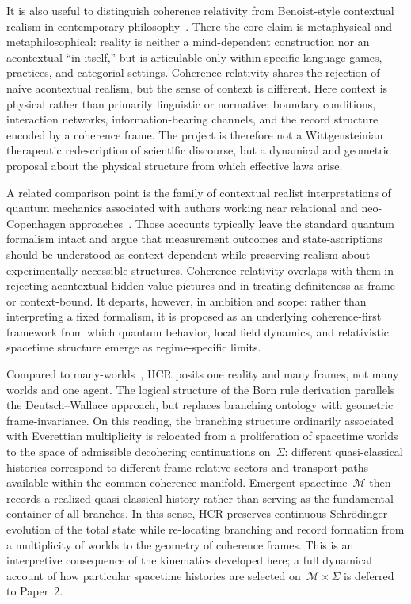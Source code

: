 \documentclass[aps,prd,twocolumn,superscriptaddress,nofootinbib,floatfix]{revtex4-2}
\newcommand{\Sig}{\Sigma}
\newcommand{\HCR}{HCR}
\newcommand{\CR}{\HCR}  %
\begin{document}
It is also useful to distinguish coherence relativity from Benoist-style contextual realism in contemporary philosophy~\cite{Benoist2021ContextualRealism}. There the core claim is metaphysical and metaphilosophical: reality is neither a mind-dependent construction nor an acontextual ``in-itself,'' but is articulable only within specific language-games, practices, and categorial settings. Coherence relativity shares the rejection of naive acontextual realism, but the sense of context is different. Here context is physical rather than primarily linguistic or normative: boundary conditions, interaction networks, information-bearing channels, and the record structure encoded by a coherence frame. The project is therefore not a Wittgensteinian therapeutic redescription of scientific discourse, but a dynamical and geometric proposal about the physical structure from which effective laws arise.

A related comparison point is the family of contextual realist interpretations of quantum mechanics associated with authors working near relational and neo-Copenhagen approaches~\cite{Pris2021RealMeaningQuantumMechanics}. Those accounts typically leave the standard quantum formalism intact and argue that measurement outcomes and state-ascriptions should be understood as context-dependent while preserving realism about experimentally accessible structures. Coherence relativity overlaps with them in rejecting acontextual hidden-value pictures and in treating definiteness as frame- or context-bound. It departs, however, in ambition and scope: rather than interpreting a fixed formalism, it is proposed as an underlying coherence-first framework from which quantum behavior, local field dynamics, and relativistic spacetime structure emerge as regime-specific limits.

Compared to many-worlds~\cite{everettRelativeStateFormulation1957,dewittManyWorldsInterpretationQuantum1973}, \CR{} posits one reality and many frames, not many worlds and one agent. The logical structure of the Born rule derivation parallels the Deutsch--Wallace approach, but replaces branching ontology with geometric frame-invariance. On this reading, the branching structure ordinarily associated with Everettian multiplicity is relocated from a proliferation of spacetime worlds to the space of admissible decohering continuations on~$\Sig$: different quasi-classical histories correspond to different frame-relative sectors and transport paths available within the common coherence manifold. Emergent spacetime~$\mathcal{M}$ then records a realized quasi-classical history rather than serving as the fundamental container of all branches. In this sense, \CR{} preserves continuous Schr\"odinger evolution of the total state while re-locating branching and record formation from a multiplicity of worlds to the geometry of coherence frames. This is an interpretive consequence of the kinematics developed here; a full dynamical account of how particular spacetime histories are selected on~$\mathcal{M}\times\Sig$ is deferred to Paper~2.
\end{document}
